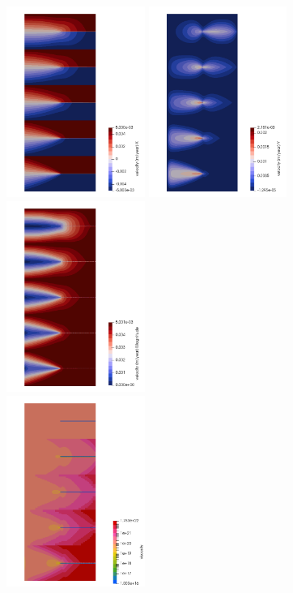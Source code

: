 \begin{center}
\includegraphics[width=4.52cm]{python_codes/fieldstone_87/results/experiment_07/u}
\includegraphics[width=4.52cm]{python_codes/fieldstone_87/results/experiment_07/v}
\includegraphics[width=4.52cm]{python_codes/fieldstone_87/results/experiment_07/vel}\\
\includegraphics[width=4.52cm]{python_codes/fieldstone_87/results/experiment_07/eta}

\end{center}
